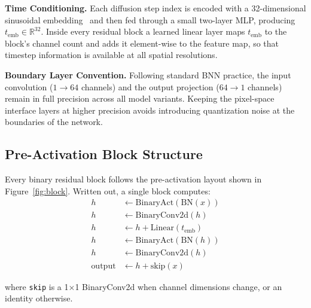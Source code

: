 \documentclass[twocolumn, journal]{IEEEtran}
\begin{document}
\textbf{Time Conditioning.} Each diffusion step index is encoded with a 32-dimensional
sinusoidal embedding~\cite{vaswani2017attention} and then fed through a small two-layer
MLP, producing $t_\text{emb} \in \mathbb{R}^{32}$. Inside every residual block a
learned linear layer maps $t_\text{emb}$ to the block's channel count and adds it
element-wise to the feature map, so that timestep information is available at all
spatial resolutions.

\textbf{Boundary Layer Convention.} Following standard BNN practice, the input
convolution ($1{\to}64$ channels) and the output projection ($64{\to}1$ channels) remain
in full precision across all model variants. Keeping the pixel-space interface layers at
higher precision avoids introducing quantization noise at the boundaries of the network.

\subsection{Pre-Activation Block Structure}

Every binary residual block follows the pre-activation layout shown in
Figure~\ref{fig:block}. Written out, a single block computes:
\begin{align*}
  h &\leftarrow \text{BinaryAct}\!\left(\text{BN}(x)\right) \\
  h &\leftarrow \text{BinaryConv2d}(h) \\
  h &\leftarrow h + \text{Linear}(t_\text{emb}) \\
  h &\leftarrow \text{BinaryAct}\!\left(\text{BN}(h)\right) \\
  h &\leftarrow \text{BinaryConv2d}(h) \\
  \text{output} &\leftarrow h + \text{skip}(x)
\end{align*}

where \texttt{skip} is a 1$\times$1 BinaryConv2d when channel dimensions change, or an
identity otherwise.
\end{document}
